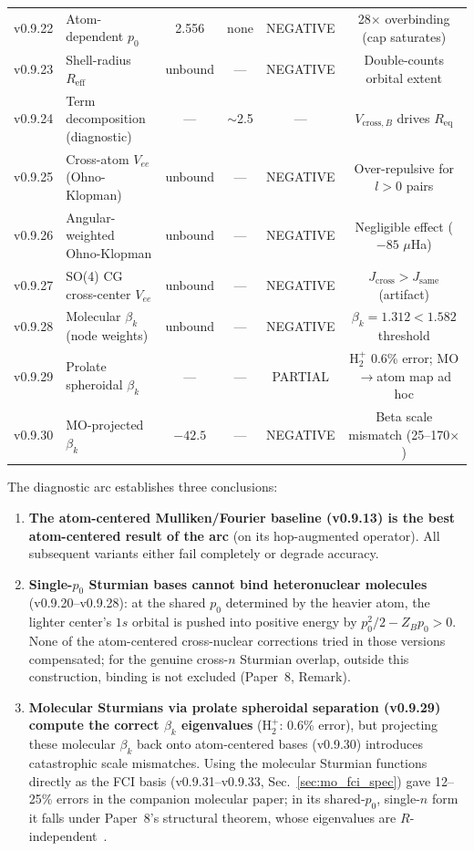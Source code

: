 \documentclass[aps,pra,twocolumn,superscriptaddress,longbibliography,floatfix]{revtex4-2}
\begin{document}
\begin{table}[!htbp]
\begin{tabular}{llcccc}
v0.9.22 & Atom-dependent $p_0$ & 2.556 & none & NEGATIVE & 28$\times$ overbinding (cap saturates) \\
v0.9.23 & Shell-radius $R_{\text{eff}}$ & unbound & --- & NEGATIVE & Double-counts orbital extent \\
v0.9.24 & Term decomposition (diagnostic) & --- & $\sim$2.5 & --- & $V_{\text{cross},B}$ drives $R_{\text{eq}}$ \\
v0.9.25 & Cross-atom $V_{ee}$ (Ohno-Klopman) & unbound & --- & NEGATIVE & Over-repulsive for $l>0$ pairs \\
v0.9.26 & Angular-weighted Ohno-Klopman & unbound & --- & NEGATIVE & Negligible effect ($-85$ $\mu$Ha) \\
v0.9.27 & SO(4) CG cross-center $V_{ee}$ & unbound & --- & NEGATIVE & $J_{\text{cross}} > J_{\text{same}}$ (artifact) \\
v0.9.28 & Molecular $\beta_k$ (node weights) & unbound & --- & NEGATIVE & $\beta_k = 1.312 < 1.582$ threshold \\
v0.9.29 & Prolate spheroidal $\beta_k$ & --- & --- & PARTIAL & H$_2^+$ 0.6\% error; MO$\to$atom map ad hoc \\
v0.9.30 & MO-projected $\beta_k$ & $-42.5$ & --- & NEGATIVE & Beta scale mismatch (25--170$\times$) \\
\hline
\end{tabular}
\end{table}

The diagnostic arc establishes three conclusions:

\begin{enumerate}
\item \textbf{The atom-centered Mulliken/Fourier baseline (v0.9.13) is
the best atom-centered result of the arc} (on its hop-augmented operator).  All subsequent variants either fail completely or degrade
accuracy.

\item \textbf{Single-$p_0$ Sturmian bases cannot bind heteronuclear
molecules} (v0.9.20--v0.9.28): at the shared $p_0$ determined by the
heavier atom, the lighter center's $1s$ orbital is pushed into positive
energy by $p_0^2/2 - Z_B p_0 > 0$.  None of the atom-centered
cross-nuclear corrections tried in those versions compensated; for the
genuine cross-$n$ Sturmian overlap, outside this construction, binding
is not excluded (Paper~8, Remark).

\item \textbf{Molecular Sturmians via prolate spheroidal separation
(v0.9.29) compute the correct $\beta_k$ eigenvalues} (H$_2^+$: 0.6\%
error), but projecting these molecular $\beta_k$ back onto atom-centered
bases (v0.9.30) introduces catastrophic scale mismatches.  Using the
molecular Sturmian functions directly as the FCI basis
(v0.9.31--v0.9.33, Sec.~\ref{sec:mo_fci_spec}) gave 12--25\% errors in
the companion molecular paper; in its shared-$p_0$, single-$n$ form it
falls under Paper~8's structural theorem, whose eigenvalues are
$R$-independent~\cite{loutey_bond_sphere_sturmian}.
\end{enumerate}
\end{document}
